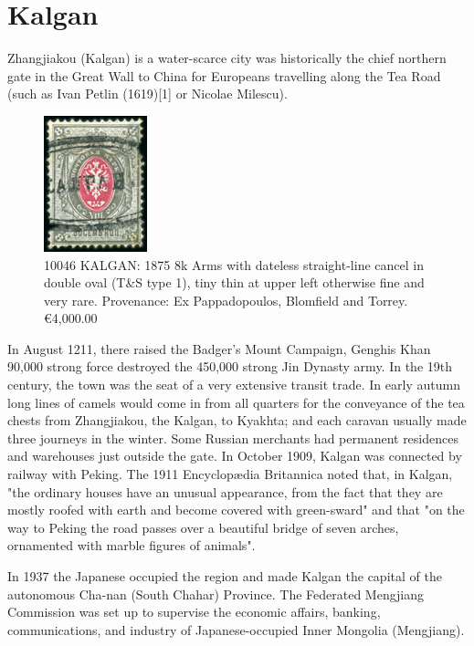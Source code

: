 \chapter{Kalgan}
Zhangjiakou (Kalgan) is a 
water-scarce city was historically the chief northern gate in the Great Wall 
to China for Europeans travelling along the Tea Road (such as Ivan Petlin (1619)[1] 
or Nicolae Milescu).

\begin{figure}[htbp]
\centering
\includegraphics[width=.30\textwidth]{../russian-post-offices-in-china/10046.jpg}
\caption{
10046	KALGAN: 1875 8k Arms with dateless straight-line cancel in double 
oval (T\&S type 1), tiny thin at upper left otherwise fine and very rare.
Provenance: Ex Pappadopoulos, Blomfield and Torrey.
\euro 4,000.00 
}  
\end{figure}

In August 1211, there raised the Badger's Mount Campaign, Genghis Khan 90,000 
strong force destroyed the 450,000 strong Jin Dynasty army.
In the 19th century, the town was the seat of a very extensive transit trade. 
In early autumn long lines of camels would come in from all quarters for the conveyance of the tea chests from Zhangjiakou, the Kalgan, to Kyakhta; and each caravan usually made three journeys in the winter. 
Some Russian merchants had permanent residences and warehouses just outside the gate.
In October 1909, Kalgan was connected by railway with Peking. 
The 1911 Encyclop\ae dia Britannica noted that, in Kalgan, 
"the ordinary houses have an unusual appearance, from the fact 
that they are mostly roofed with earth and become covered with green-sward" 
and that "on the way to Peking the road passes over a beautiful bridge of 
seven arches, ornamented with marble figures of animals".

In 1937 the Japanese occupied the region and made Kalgan the capital of the 
autonomous Cha-nan (South Chahar) Province. The Federated Mengjiang 
Commission was set up to supervise the economic affairs, banking, 
communications, and industry of Japanese-occupied Inner Mongolia (Mengjiang).

